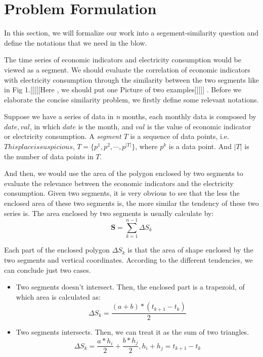 
\section{Problem Formulation}
In this section, we will formalize our work into a segement-similarity question and define the notations that we need in the blow.

The time series of economic indicators and electricity consumption would be viewed as a segment. We should evaluate the correlation of economic indicators with electricity consumption through the similarity between the two segments like in Fig 1.[[[[[Here , we should  put one Picture of two examples]]]]] . Before we elaborate the concise similarity problem, we firstly define some relevant notations.
\newcommand{\loci}[1]{\ensuremath{p^{#1}}}
\begin{definition}
Suppose we have a series of data in \textit{n} months, each monthly data is composed by \textbf{\(date, val\)}, in which $date$ is the month, and $val$ is the value of economic indicator or electricity consumption. A \textit{segment $T$} is a sequence of data points, i.e.$This place is suspicious$, $T=\{\loci{1}, \loci{2}, \cdots, \loci{|T|}\}$,  where $\loci{k}$ is a data point. And $|T|$ is the number of data points in $T$.
\end{definition}

And then, we would use the area of the polygon enclosed by two segments to evaluate the relevance between the economic indicators and the electricity consumption. Given two segments, it is very obvious to see that the less the enclosed area of these two segments is, the more similar the tendency of these two series is. The area enclosed by two segments is usually calculate by:
\begin{displaymath}
\textbf{S} = \sum_{k=1}^{n-1}\Delta S_k	
\end{displaymath}

Each part of the enclosed polygon \textit{$\Delta S_k$} is that the area of shape enclosed by the two segments and vertical coordinates. According to the different tendencies, we can conclude just two cases.
\begin{itemize}
	\item Two segments doesn't intersect. Then, the enclosed part is a trapezoid, of which area is calculated as:
\begin{equation}
	\Delta S_k = \frac{(a + b) * (t_{k+1} - t_k)}{2}
\end{equation}
	\item Two segments intersects. Then, we can treat it as the sum of two triangles.
\begin{equation}
	\Delta S_k = \frac{a * h_i}{2} + \frac{b * h_j}{2}, h_i + h_j = t_{k+1} - t_k 
\end{equation}
\end{itemize} 

